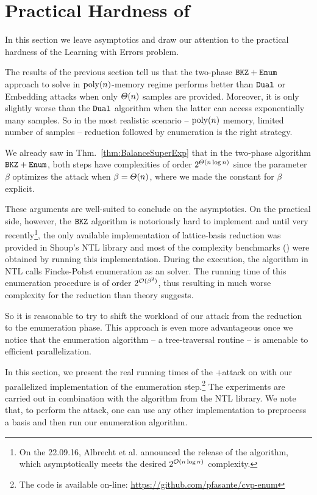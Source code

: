 \section{Practical Hardness of \LWE} \label{sec:LWEasBDDPr}

In this section we leave asymptotics and draw our attention to the practical hardness of the Learning with Errors problem. 

The results of the previous section tell us that the two-phase $\texttt{BKZ}+\texttt{Enum}$ approach to solve \LWE in $\mathrm{poly}(n)$-memory regime performs better than $\texttt{Dual}$ or Embedding attacks when only $\varTheta(n)$ samples are provided. Moreover, it is only slightly worse than the $\texttt{Dual}$ algorithm when the latter can access exponentially many samples. So in the most realistic scenario -- $\mathrm{poly}(n)$ memory, limited number of samples -- \BKZ reduction followed by enumeration is the right strategy.

We already saw in Thm.~\ref{thm:BalanceSuperExp} that in the two-phase algorithm $\texttt{BKZ}+\texttt{Enum}$, both steps have complexities of order $2^{\varTheta(n \log n)}$ since the \BKZ parameter $\beta$ optimizes the attack when $\beta = \varTheta(n)$, where we made the constant for $\beta$ explicit. 

These arguments are well-suited to conclude on the asymptotics. On the practical side, however, the $\texttt{BKZ}$ algorithm is notoriously hard to implement and until very recently\footnote{On the 22.09.16, Albrecht et al. announced \cite{fplll} the release of the  algorithm, which asymptotically meets the desired $2^{\mathcal{O}(n \log n)}$ complexity.}, the only available implementation of lattice-basis reduction was provided in Shoup's NTL library \cite{Sho} and most of the complexity benchmarks (\cite{APS15,MicReg09,EC:NguReg06}) were obtained by running this implementation. During the execution, the \BKZ algorithm in NTL calls Fincke-Pohst enumeration \cite{FinPoh83} as an \SVP solver. The running time of this enumeration procedure is of order $2^{\mathcal{O}(\beta^2)}$, thus resulting in much worse complexity for the reduction than theory suggests.

So it is reasonable to try to shift the workload of our \BDD attack from the reduction to the enumeration phase. This approach is even more advantageous once we notice that the enumeration algorithm -- a tree-traversal routine -- is amenable to efficient parallelization. 

In this section, we present the real running times of the \BKZ+\ENUM attack on \LWE with our parallelized implementation of the enumeration step.\footnote{The code is available on-line: \url{https://github.com/pfasante/cvp-enum}} The experiments are carried out in combination with the \BKZ algorithm from the NTL library. We note that, to perform the attack, one can use any other \BKZ implementation to preprocess a basis and then run our enumeration algorithm.

